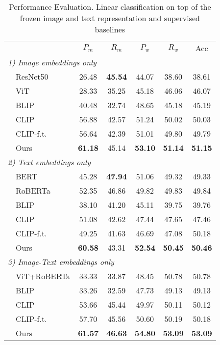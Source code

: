 \begin{table}
    \centering
    \caption{ Performance Evaluation. Linear classification on top
of the frozen image and text representation and supervised baselines}
    \label{tab: performance comparison}
    \begin{tabular}{llccccc}
    \hline
    &            & $P_m$ & $R_m$ & $P_w$ & $R_w$ & Acc \\ 
    
    \multicolumn{7}{l}{\emph{1) Image embeddings only}} \\ 
    \hline
    &   ResNet50    & 26.48 & \textbf{45.54} & 44.07 & 38.60 & 38.61\\
    &   ViT         & 28.33 & 35.25 & 45.18 & 46.06 & 46.07 \\
    &   BLIP        & 40.48 & 32.74 & 48.65 & 45.18 & 45.19 \\
    \cline{2-7}
    &   CLIP        & 56.88 & 42.57 & 51.24 & 50.02 & 50.03   \\
    &   CLIP-f.t.   & 56.64 & 42.39 & 51.01 & 49.80 & 49.79 \\
    &   Ours        & \textbf{61.18} & 45.14 & \textbf{53.10} & \textbf{51.14} & \textbf{51.15} \\
    \cline{2-7}
    \multicolumn{7}{l}{\emph{2) Text embeddings only}}\\
    \hline
    &   BERT        & 45.28 & \textbf{47.94}& 51.06 & 49.32 & 49.33 \\
    &   RoBERTa     & 52.35 & 46.86 & 49.82 & 49.83  & 49.84 \\
    &   BLIP        & 38.10 & 41.20 & 45.11 & 39.75 & 39.76 \\
    \cline{2-7}
    &   CLIP        & 51.08 & 42.62 & 47.44 & 47.65 & 47.46   \\
    &   CLIP-f.t.   & 49.25 & 41.63 & 46.69 & 47.08 & 50.18 \\
    &   Ours        & \textbf{60.58} & 43.31 & \textbf{52.54} & \textbf{50.45} & \textbf{50.46} \\
    \cline{2-7}
    
    \multicolumn{7}{l}{\emph{3) Image-Text embeddings only}}\\
    \hline
    &   ViT+RoBERTa & 33.33 & 33.87  & 48.45 & 50.78 & 50.78 \\
    &   BLIP        & 33.26 & 32.59 & 47.73 & 49.13 & 49.13 \\
    \cline{2-7}    
    &   CLIP        & 53.66 & 45.44 & 49.97 & 50.11 & 50.12   \\
    &   CLIP-f.t.   & 57.70 & 45.56 & 50.60 & 50.19 & 50.18 \\
    &   Ours        & \textbf{61.57} & \textbf{46.63} & \textbf{54.80} & \textbf{53.09} & \textbf{53.09} \\
    \hline
    
    \end{tabular} 
\end{table}

